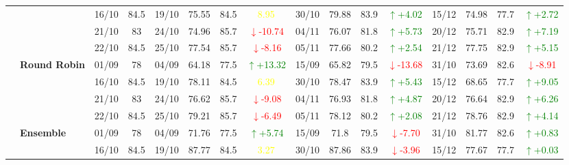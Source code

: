 \documentclass{ieeeaccess}
\begin{document}
{\begin{longtable}{llcc|cccc|cccc|cccc}
&
& 16/10 & 84.5 & 19/10 & 75.55 & 84.5 & \textcolor{yellow}{8.95} & 30/10 & 79.88 & 83.9 & \textcolor{green}{\(\uparrow\)+4.02} & 15/12 & 74.98 & 77.7 & \textcolor{green}{\(\uparrow\)+2.72} \\

&
& 21/10 & 83 & 24/10 & 74.96 & 85.7 & \textcolor{red}{\(\downarrow\)-10.74} & 04/11 & 76.07 & 81.8 & \textcolor{green}{\(\uparrow\)+5.73} & 20/12 & 75.71 & 82.9 & \textcolor{green}{\(\uparrow\)+7.19} \\

&
& 22/10 & 84.5 & 25/10 & 77.54 & 85.7 & \textcolor{red}{\(\downarrow\)-8.16} & 05/11 & 77.66 & 80.2 & \textcolor{green}{\(\uparrow\)+2.54} & 21/12 & 77.75 & 82.9 & \textcolor{green}{\(\uparrow\)+5.15} \\
\cmidrule(lr){2-16}


& \textbf{Round Robin}
& 01/09 & 78 & 04/09 & 64.18 & 77.5 & \textcolor{green}{\(\uparrow\)+13.32} & 15/09 & 65.82 & 79.5 & \textcolor{red}{\(\downarrow\)-13.68} & 31/10 & 73.69 & 82.6 & \textcolor{red}{\(\downarrow\)-8.91} \\

&
& 16/10 & 84.5 & 19/10 & 78.11 & 84.5 & \textcolor{yellow}{6.39} & 30/10 & 78.47 & 83.9 & \textcolor{green}{\(\uparrow\)+5.43} & 15/12 & 68.65 & 77.7 & \textcolor{green}{\(\uparrow\)+9.05} \\

&
& 21/10 & 83 & 24/10 & 76.62 & 85.7 & \textcolor{red}{\(\downarrow\)-9.08} & 04/11 & 76.93 & 81.8 & \textcolor{green}{\(\uparrow\)+4.87} & 20/12 & 76.64 & 82.9 & \textcolor{green}{\(\uparrow\)+6.26} \\

&
& 22/10 & 84.5 & 25/10 & 79.21 & 85.7 & \textcolor{red}{\(\downarrow\)-6.49} & 05/11 & 78.12 & 80.2 & \textcolor{green}{\(\uparrow\)+2.08} & 21/12 & 78.76 & 82.9 & \textcolor{green}{\(\uparrow\)+4.14} \\
\cmidrule(lr){2-16}




& \textbf{Ensemble}
& 01/09 & 78 & 04/09 & 71.76 & 77.5 & \textcolor{green}{\(\uparrow\)+5.74} & 15/09 & 71.8 & 79.5 & \textcolor{red}{\(\downarrow\)-7.70} & 31/10 & 81.77 & 82.6 & \textcolor{green}{\(\uparrow\)+0.83} \\

&
& 16/10 & 84.5 & 19/10 & 87.77 & 84.5 & \textcolor{yellow}{3.27} & 30/10 & 87.86 & 83.9 & \textcolor{red}{\(\downarrow\)-3.96} & 15/12 & 77.67 & 77.7 & \textcolor{green}{\(\uparrow\)+0.03} \\


\end{longtable}}
\end{document}
